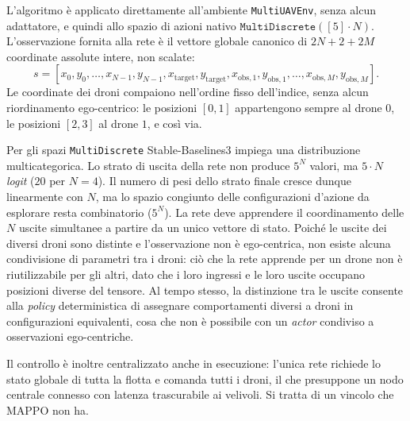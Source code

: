 \documentclass[12pt,a4paper,twoside]{report}
\begin{document}
L'algoritmo è applicato direttamente all'ambiente \texttt{MultiUAVEnv}, senza alcun adattatore, e quindi allo spazio di azioni nativo $\texttt{MultiDiscrete}([5] \cdot N)$. L'osservazione fornita alla rete è il vettore globale canonico di $2N + 2 + 2M$ coordinate assolute intere, non scalate:
\[
s = [x_0, y_0, \dots, x_{N-1}, y_{N-1}, x_{\text{target}}, y_{\text{target}}, x_{\text{obs},1}, y_{\text{obs},1}, \dots, x_{\text{obs},M}, y_{\text{obs},M}].
\]
Le coordinate dei droni compaiono nell'ordine fisso dell'indice, senza alcun riordinamento ego-centrico: le posizioni $[0, 1]$ appartengono sempre al drone $0$, le posizioni $[2, 3]$ al drone $1$, e così via.

Per gli spazi \texttt{MultiDiscrete} Stable-Baselines3 impiega una distribuzione multicategorica. Lo strato di uscita della rete non produce $5^N$ valori, ma $5 \cdot N$ \emph{logit} ($20$ per $N = 4$).
Il numero di pesi dello strato finale cresce dunque linearmente con $N$, ma lo spazio congiunto delle configurazioni d'azione da esplorare resta combinatorio ($5^N$). La rete deve apprendere il coordinamento delle $N$ uscite simultanee a partire da un unico vettore di stato. Poiché le uscite dei diversi droni sono distinte e l'osservazione non è ego-centrica, non esiste alcuna condivisione di parametri tra i droni: ciò che la rete apprende per un drone non è riutilizzabile per gli altri, dato che i loro ingressi e le loro uscite occupano posizioni diverse del tensore. Al tempo stesso, la distinzione tra le uscite consente alla \emph{policy} deterministica di assegnare comportamenti diversi a droni in configurazioni equivalenti, cosa che non è possibile con un \emph{actor} condiviso a osservazioni ego-centriche.

Il controllo è inoltre centralizzato anche in esecuzione: l'unica rete richiede lo stato globale di tutta la flotta e comanda tutti i droni, il che presuppone un nodo centrale connesso con latenza trascurabile ai velivoli. Si tratta di un vincolo che MAPPO non ha.
\end{document}
